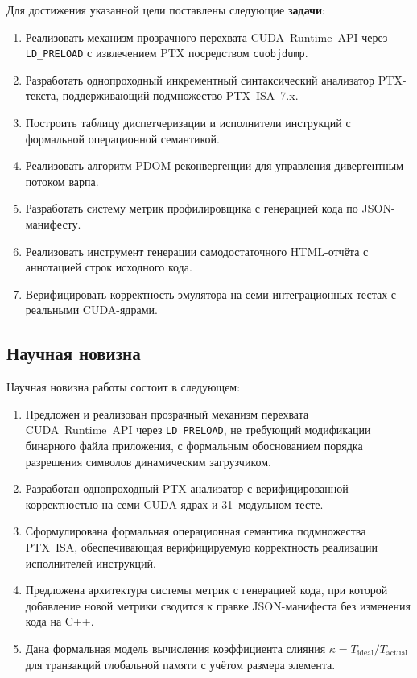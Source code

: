 Для достижения указанной цели поставлены следующие \textbf{задачи}:
\begin{enumerate}
  \item Реализовать механизм прозрачного перехвата CUDA~Runtime~API
        через \texttt{LD\_PRELOAD} с извлечением PTX посредством \texttt{cuobjdump}.
  \item Разработать однопроходный инкрементный синтаксический анализатор
        PTX-текста, поддерживающий подмножество PTX~ISA~7.x.
  \item Построить таблицу диспетчеризации и исполнители инструкций
        с формальной операционной семантикой.
  \item Реализовать алгоритм PDOM-реконвергенции для управления
        дивергентным потоком варпа.
  \item Разработать систему метрик профилировщика с генерацией кода
        по JSON-манифесту.
  \item Реализовать инструмент генерации самодостаточного HTML-отчёта
        с аннотацией строк исходного кода.
  \item Верифицировать корректность эмулятора на семи интеграционных
        тестах с реальными CUDA-ядрами.
\end{enumerate}


\subsection{Научная новизна}

Научная новизна работы состоит в следующем:

\begin{enumerate}
  \item Предложен и реализован прозрачный механизм перехвата
        CUDA~Runtime~API через \texttt{LD\_PRELOAD}, не требующий
        модификации бинарного файла приложения, с формальным
        обоснованием порядка разрешения символов динамическим
        загрузчиком.
  \item Разработан однопроходный PTX-анализатор с верифицированной
        корректностью на семи CUDA-ядрах и 31~модульном тесте.
  \item Сформулирована формальная операционная семантика подмножества
        PTX~ISA, обеспечивающая верифицируемую корректность реализации
        исполнителей инструкций.
  \item Предложена архитектура системы метрик с генерацией кода, при
        которой добавление новой метрики сводится к правке JSON-манифеста
        без изменения кода на C++.
  \item Дана формальная модель вычисления коэффициента слияния
        \(\kappa = T_{\mathrm{ideal}} / T_{\mathrm{actual}}\) для
        транзакций глобальной памяти с учётом размера элемента.
\end{enumerate}


